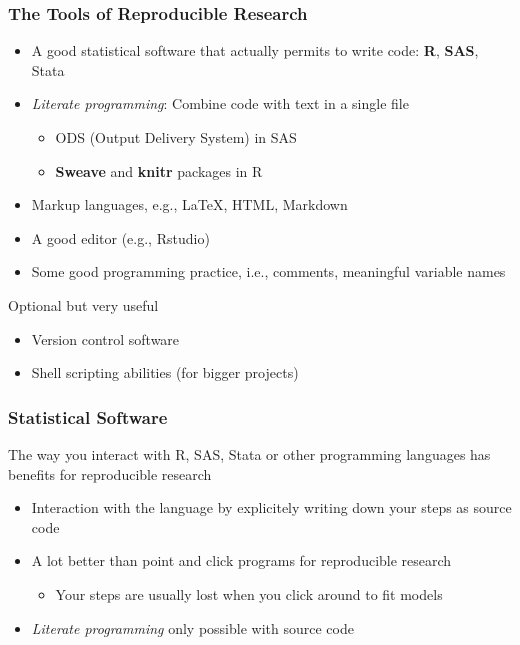 \documentclass[paper=screen,mathserif]{beamer}\usepackage[]{graphicx}\usepackage[]{color}
\begin{document}
\begin{frame}
  \frametitle{The Tools of Reproducible Research}
  \begin{itemize}
  \item A good statistical software that actually permits to write
    code: {\bf R}, {\bf SAS}, Stata
  \item {\em Literate programming}: Combine code with text in a single
    file
    \begin{itemize}
    \item ODS (Output Delivery System) in SAS
    \item {\bf Sweave} and {\bf knitr} packages in R
    \end{itemize}
  \item Markup languages, e.g., \LaTeX, HTML, Markdown
  \item A good editor (e.g., Rstudio)
  \item Some good programming practice, i.e., comments, meaningful
    variable names
  \end{itemize}\pause
  Optional but very useful
  \begin{itemize}
  \item Version control software
  \item Shell scripting abilities (for bigger projects)
  \end{itemize}
\end{frame}

\begin{frame}
  \frametitle{Statistical Software}
  The way you interact with R, SAS, Stata or other programming
  languages has benefits for reproducible research
  \begin{itemize}
  \item Interaction with the language by explicitely writing down your
    steps as source code
  \item A lot better than point and click programs for reproducible
    research
    \begin{itemize}
    \item Your steps are usually lost when you click around to fit
      models 
    \end{itemize}
  \item {\em Literate programming} only possible with source code
  \end{itemize}
\end{frame}
\end{document}
